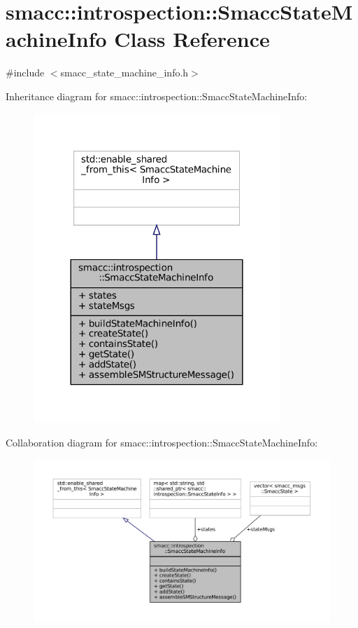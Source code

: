 \hypertarget{classsmacc_1_1introspection_1_1SmaccStateMachineInfo}{}\section{smacc\+:\+:introspection\+:\+:Smacc\+State\+Machine\+Info Class Reference}
\label{classsmacc_1_1introspection_1_1SmaccStateMachineInfo}


{\ttfamily \#include $<$smacc\+\_\+state\+\_\+machine\+\_\+info.\+h$>$}



Inheritance diagram for smacc\+:\+:introspection\+:\+:Smacc\+State\+Machine\+Info\+:
\nopagebreak
\begin{figure}[H]
\begin{center}
\leavevmode
\includegraphics[width=264pt]{classsmacc_1_1introspection_1_1SmaccStateMachineInfo__inherit__graph}
\end{center}
\end{figure}


Collaboration diagram for smacc\+:\+:introspection\+:\+:Smacc\+State\+Machine\+Info\+:
\nopagebreak
\begin{figure}[H]
\begin{center}
\leavevmode
\includegraphics[width=350pt]{classsmacc_1_1introspection_1_1SmaccStateMachineInfo__coll__graph}
\end{center}
\end{figure}
